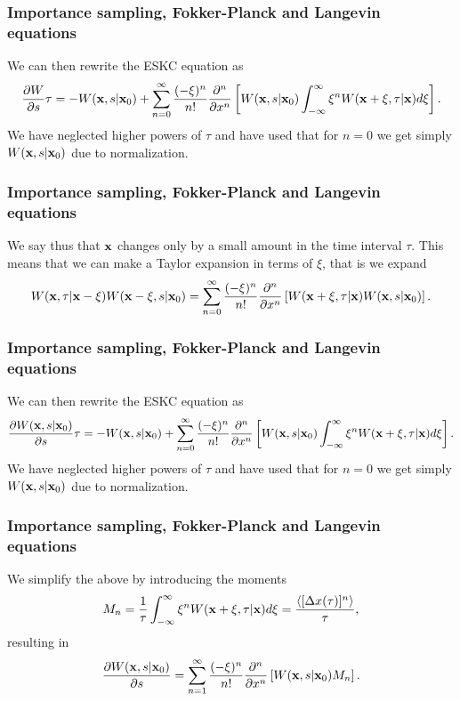 \documentclass{beamer}
\begin{document}
\begin{frame}
\frametitle{Importance sampling, Fokker-Planck and Langevin equations}

\begin{block}{}
We can then rewrite the ESKC equation as 
\[
\frac{\partial W}{\partial s}\tau=-W({\bf x},s|{\bf x}_0)+
\sum_{n=0}^{\infty}\frac{(-\xi)^n}{n!}\frac{\partial^n}{\partial x^n}
\left[W({\bf x},s|{\bf x}_0)\int_{-\infty}^{\infty} \xi^nW({\bf x}+\xi,\tau|{\bf x})d\xi\right].
\]
We have neglected higher powers of $\tau$ and have used that for $n=0$ 
we get simply $W({\bf x},s|{\bf x}_0)$ due to normalization.
\end{block}
\end{frame}

\begin{frame}
\frametitle{Importance sampling, Fokker-Planck and Langevin equations}

\begin{block}{}
We say thus that ${\bf x}$ changes only by a small amount in the time interval $\tau$. 
This means that we can make a Taylor expansion in terms of $\xi$, that is we
expand
\[
W({\bf x},\tau|{\bf x}-\xi)W({\bf x}-\xi,s|{\bf x}_0) =
\sum_{n=0}^{\infty}\frac{(-\xi)^n}{n!}\frac{\partial^n}{\partial x^n}\left[W({\bf x}+\xi,\tau|{\bf x})W({\bf x},s|{\bf x}_0)
\right].
\]
\end{block}
\end{frame}

\begin{frame}
\frametitle{Importance sampling, Fokker-Planck and Langevin equations}

\begin{block}{}
We can then rewrite the ESKC equation as 
\[
\frac{\partial W({\bf x},s|{\bf x}_0)}{\partial s}\tau=-W({\bf x},s|{\bf x}_0)+
\sum_{n=0}^{\infty}\frac{(-\xi)^n}{n!}\frac{\partial^n}{\partial x^n}
\left[W({\bf x},s|{\bf x}_0)\int_{-\infty}^{\infty} \xi^nW({\bf x}+\xi,\tau|{\bf x})d\xi\right].
\]
We have neglected higher powers of $\tau$ and have used that for $n=0$ 
we get simply $W({\bf x},s|{\bf x}_0)$ due to normalization.


\end{block}
\end{frame}

\begin{frame}
\frametitle{Importance sampling, Fokker-Planck and Langevin equations}

\begin{block}{}
We simplify the above by introducing the moments 
\[
M_n=\frac{1}{\tau}\int_{-\infty}^{\infty} \xi^nW({\bf x}+\xi,\tau|{\bf x})d\xi=
\frac{\langle [\Delta x(\tau)]^n\rangle}{\tau},
\]
resulting in
\[
\frac{\partial W({\bf x},s|{\bf x}_0)}{\partial s}=
\sum_{n=1}^{\infty}\frac{(-\xi)^n}{n!}\frac{\partial^n}{\partial x^n}
\left[W({\bf x},s|{\bf x}_0)M_n\right].
\]
\end{block}
\end{frame}
\end{document}
